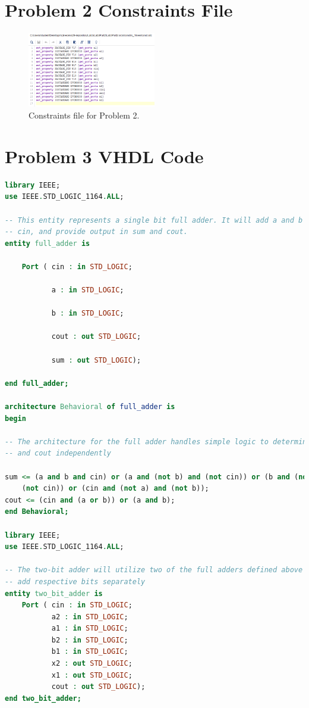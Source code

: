 \documentclass[11pt]{article}
\begin{document}
\begin{appendices}
\section{Problem 2 Constraints File}
\begin{figure}[H]
\begin{center}
	\includegraphics[width=0.5\textwidth]{./report-images/Part2/P2Const.png}
	\caption{\label{fig:Part2ConstFile}Constraints file for Problem 2.}
\end{center}
\end{figure}

\section{Problem 3 VHDL Code}
\begin{lstlisting}[language=VHDL]
library IEEE;
use IEEE.STD_LOGIC_1164.ALL;

-- This entity represents a single bit full adder. It will add a and b along with 
-- cin, and provide output in sum and cout.
entity full_adder is

    Port ( cin : in STD_LOGIC;

           a : in STD_LOGIC;

           b : in STD_LOGIC;

           cout : out STD_LOGIC;

           sum : out STD_LOGIC);

end full_adder;

architecture Behavioral of full_adder is
begin

-- The architecture for the full adder handles simple logic to determine sum 
-- and cout independently

sum <= (a and b and cin) or (a and (not b) and (not cin)) or (b and (not a) and 
	(not cin)) or (cin and (not a) and (not b));
cout <= (cin and (a or b)) or (a and b);
end Behavioral;

library IEEE;
use IEEE.STD_LOGIC_1164.ALL;

-- The two-bit adder will utilize two of the full adders defined above to 
-- add respective bits separately
entity two_bit_adder is
    Port ( cin : in STD_LOGIC;
           a2 : in STD_LOGIC;
           a1 : in STD_LOGIC;
           b2 : in STD_LOGIC;
           b1 : in STD_LOGIC;
           x2 : out STD_LOGIC;
           x1 : out STD_LOGIC;
           cout : out STD_LOGIC);
end two_bit_adder;


\end{lstlisting}
\end{appendices}
\end{document}
